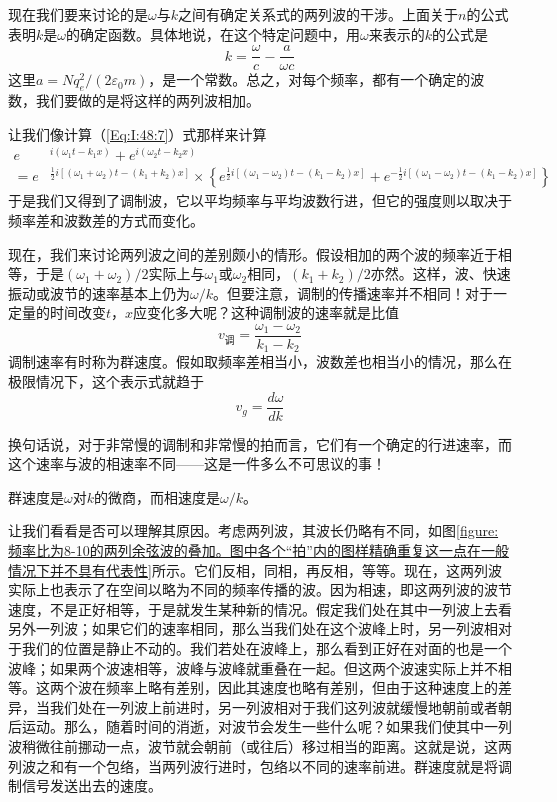 现在我们要来讨论的是$\omega$与$k$之间有确定关系式的两列波的干涉。上面关于$n$的公式表明$k$是$\omega$的确定函数。具体地说，在这个特定问题中，用$\omega$来表示的$k$的公式是
\begin{equation}
    \label{Eq:I:48:14}
    k = \frac{\omega}{c} - \frac{a}{\omega c}
\end{equation}
这里$a=Nq_e^2/(2\varepsilon_0m)$，是一个常数。总之，对每个频率，都有一个确定的波数，我们要做的是将这样的两列波相加。

让我们像计算（\ref{Eq:I:48:7}）式那样来计算
\begin{equation}
    \label{Eq:I:48:15}
    \begin{aligned}
        e&^{i(\omega_1t - k_1x)} + e^{i(\omega_2t - k_2x)} \\
        = e&^{\frac{1}{2}i[(\omega_1+\omega_2)t-(k_1+k_2)x]} \times \left\{e^{\frac{1}{2}i[(\omega_1-\omega_2)t-(k_1-k_2)x]} + e^{-\frac{1}{2}i[(\omega_1 - \omega_2)t - (k_1-k_2)x]}\right\}
    \end{aligned}
\end{equation}
于是我们又得到了调制波，它以平均频率与平均波数行进，但它的强度则以取决于频率差和波数差的方式而变化。

现在，我们来讨论两列波之间的差别颇小的情形。假设相加的两个波的频率近于相等，于是$(\omega_1 +\omega_2)/2$实际上与$\omega_1$或$\omega_2$相同，$(k_1 +k_2)/2$亦然。这样，波、快速振动或波节的速率基本上仍为$\omega/k$。但要注意，调制的传播速率并不相同！对于一定量的时间改变$t$，$x$应变化多大呢？这种调制波的速率就是比值
\begin{equation}
    \label{Eq:I:48:16}
    v_\text{调} = \frac{\omega_1 - \omega_2}{k_1 - k_2}
\end{equation}
调制速率有时称为群速度。假如取频率差相当小，波数差也相当小的情况，那么在极限情况下，这个表示式就趋于
\begin{equation}
    \label{Eq:I:48:17}
    v_g = \frac{d\omega}{dk}
\end{equation}

换句话说，对于非常慢的调制和非常慢的拍而言，它们有一个确定的行进速率，而这个速率与波的相速率不同——这是一件多么不可思议的事！

群速度是$\omega$对$k$的微商，而相速度是$\omega/k$。

让我们看看是否可以理解其原因。考虑两列波，其波长仍略有不同，如图\ref{figure:频率比为8-10的两列余弦波的叠加。图中各个“拍”内的图样精确重复这一点在一般情况下并不具有代表性}所示。它们反相，同相，再反相，等等。现在，这两列波实际上也表示了在空间以略为不同的频率传播的波。因为相速，即这两列波的波节速度，不是正好相等，于是就发生某种新的情况。假定我们处在其中一列波上去看另外一列波；如果它们的速率相同，那么当我们处在这个波峰上时，另一列波相对于我们的位置是静止不动的。我们若处在波峰上，那么看到正好在对面的也是一个波峰；如果两个波速相等，波峰与波峰就重叠在一起。但这两个波速实际上并不相等。这两个波在频率上略有差别，因此其速度也略有差别，但由于这种速度上的差异，当我们处在一列波上前进时，另一列波相对于我们这列波就缓慢地朝前或者朝后运动。那么，随着时间的消逝，对波节会发生一些什么呢？如果我们使其中一列波稍微往前挪动一点，波节就会朝前（或往后）移过相当的距离。这就是说，这两列波之和有一个包络，当两列波行进时，包络以不同的速率前进。群速度就是将调制信号发送出去的速度。

